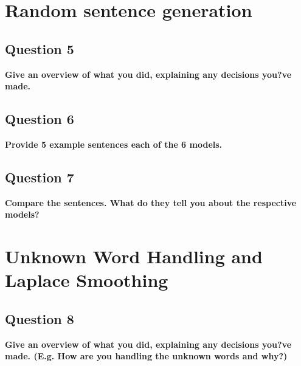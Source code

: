 \documentclass{article} %
\begin{document}

\lipsum[2] %

\section{Random sentence generation}
\subsection*{Question 5}

\textbf{Give an overview of what you did, explaining any decisions you?ve made.}
\\


\lipsum[2] %

\subsection*{Question 6}

\textbf{Provide 5 example sentences each of the 6 models.}
\\


\lipsum[2] %

\subsection*{Question 7}

\textbf{Compare the sentences. What do they tell you about the respective models?}
\\


\lipsum[2] %

\section{Unknown Word Handling and Laplace Smoothing}

\subsection*{Question 8}

\textbf{Give an overview of what you did, explaining any decisions you?ve made. (E.g. How are you handling the unknown words and why?)}
\\


\lipsum[2] %
\end{document}
